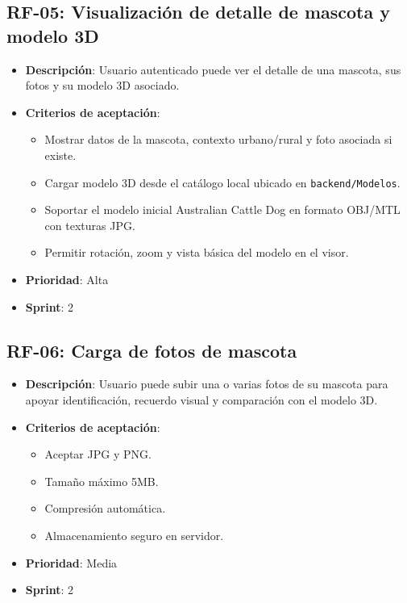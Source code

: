 \documentclass[12pt,a4paper]{article}
\begin{document}
\subsection{RF-05: Visualizaci\'on de detalle de mascota y modelo 3D}
\begin{itemize}[leftmargin=*]
    \item \textbf{Descripci\'on}: Usuario autenticado puede ver el detalle de una mascota, sus fotos y su modelo 3D asociado.
    \item \textbf{Criterios de aceptaci\'on}:
    \begin{itemize}[leftmargin=*]
        \item Mostrar datos de la mascota, contexto urbano/rural y foto asociada si existe.
        \item Cargar modelo 3D desde el cat\'alogo local ubicado en \texttt{backend/Modelos}.
        \item Soportar el modelo inicial Australian Cattle Dog en formato OBJ/MTL con texturas JPG.
        \item Permitir rotaci\'on, zoom y vista b\'asica del modelo en el visor.
    \end{itemize}
    \item \textbf{Prioridad}: Alta
    \item \textbf{Sprint}: 2
\end{itemize}

\subsection{RF-06: Carga de fotos de mascota}
\begin{itemize}[leftmargin=*]
    \item \textbf{Descripci\'on}: Usuario puede subir una o varias fotos de su mascota para apoyar identificaci\'on, recuerdo visual y comparaci\'on con el modelo 3D.
    \item \textbf{Criterios de aceptaci\'on}:
    \begin{itemize}[leftmargin=*]
        \item Aceptar JPG y PNG.
        \item Tama\~no m\'aximo 5MB.
        \item Compresi\'on autom\'atica.
        \item Almacenamiento seguro en servidor.
    \end{itemize}
    \item \textbf{Prioridad}: Media
    \item \textbf{Sprint}: 2
\end{itemize}
\end{document}
